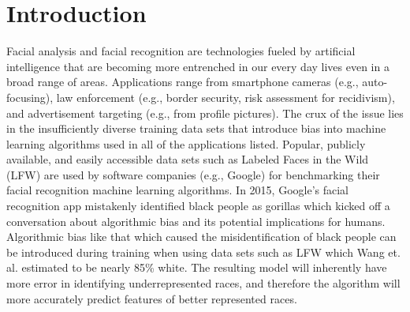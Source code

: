 \documentclass[obeyspaces, spaces, fleqn,10pt]{SelfArx} %
\begin{document}
\flushbottom %

\maketitle %

\tableofcontents %

\thispagestyle{empty} %






\section{Introduction}

Facial analysis and facial recognition are technologies fueled by artificial intelligence that are becoming more entrenched in our every day lives even in a broad range of areas. Applications range from smartphone cameras (e.g., auto-focusing), law enforcement (e.g., border security, risk assessment for recidivism), and advertisement targeting (e.g., from profile pictures).\cite{Couch:2017,Lohr:2018,Kim:2018} The crux of the issue lies in the insufficiently diverse training data sets that introduce bias into machine learning algorithms used in all of the applications listed. Popular, publicly available, and easily accessible data sets such as Labeled Faces in the Wild (LFW) are used by software companies (e.g., Google) for benchmarking their facial recognition machine learning algorithms.\cite{LFWTech,Lohr:2018} In 2015, Google's facial recognition app mistakenly identified black people as gorillas which kicked off a conversation about algorithmic bias and its potential implications for humans.\cite{dough2015,Lohr:2018} Algorithmic bias like that which caused the misidentification of black people can be introduced during training when using data sets such as LFW which Wang et. al. estimated to be nearly 85\% white.\cite{wang:2018}  The resulting model will inherently have more error in identifying underrepresented races, and therefore the algorithm will more accurately predict features of better represented races. 
\end{document}
